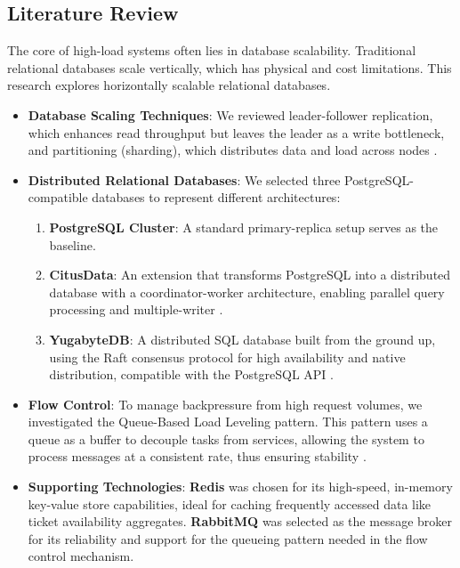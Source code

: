 \subsection{Literature Review}
The core of high-load systems often lies in database scalability. Traditional relational databases scale vertically, which has physical and cost limitations. This research explores horizontally scalable relational databases.
\begin{itemize}
    \item \textbf{Database Scaling Techniques}: We reviewed leader-follower replication, which enhances read throughput but leaves the leader as a write bottleneck, and partitioning (sharding), which distributes data and load across nodes \cite{dataIntensiveApplications}.
    \item \textbf{Distributed Relational Databases}: We selected three PostgreSQL-compatible databases to represent different architectures:
          \begin{enumerate}
              \item \textbf{PostgreSQL Cluster}: A standard primary-replica setup serves as the baseline.
              \item \textbf{CitusData}: An extension that transforms PostgreSQL into a distributed database with a coordinator-worker architecture, enabling parallel query processing and multiple-writer \cite{citus}.
              \item \textbf{YugabyteDB}: A distributed SQL database built from the ground up, using the Raft consensus protocol for high availability and native distribution, compatible with the PostgreSQL API \cite{yugabyteBaeldung}.
          \end{enumerate}
    \item \textbf{Flow Control}: To manage backpressure from high request volumes, we investigated the Queue-Based Load Leveling pattern. This pattern uses a queue as a buffer to decouple tasks from services, allowing the system to process messages at a consistent rate, thus ensuring stability \cite{queueLoadLeveling}.
    \item \textbf{Supporting Technologies}: \textbf{Redis} was chosen for its high-speed, in-memory key-value store capabilities, ideal for caching frequently accessed data like ticket availability aggregates. \textbf{RabbitMQ} was selected as the message broker for its reliability and support for the queueing pattern needed in the flow control mechanism.
\end{itemize}


